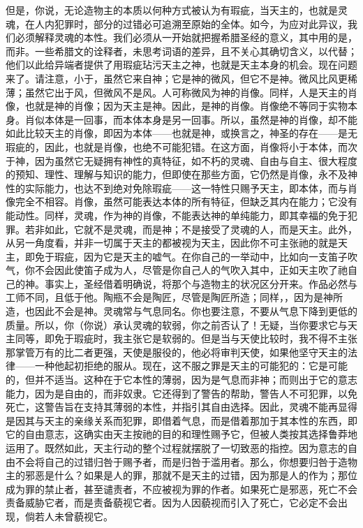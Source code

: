 但是，你说，无论造物主的本质以何种方式被认为有瑕疵，当天主的，也就是灵魂，在人内犯罪时，部分的过错必可追溯至原始的全体。如今，为应对此异议，我们必须解释灵魂的本性。我们必须从一开始就把握希腊圣经的意义，其中用的是，而非。一些希腊文的诠释者，未思考词语的差异，且不关心其确切含义，以代替；他们以此给异端者提供了用瑕疵玷污天主之神，也就是天主本身的机会。现在问题来了。请注意，小于，虽然它来自神；它是神的微风，但它不是神。微风比风更稀薄；虽然它出于风，但微风不是风。人可称微风为神的肖像。同样，人是天主的肖像，也就是神的肖像；因为天主是神。因此，是神的肖像。肖像绝不等同于实物本身。肖似本体是一回事，而本体本身是另一回事。所以，虽然是神的肖像，却不能如此比较天主的肖像，即因为本体——也就是神，或换言之，神圣的存在——是无瑕疵的，因此，也就是肖像，也绝不可能犯错。在这方面，肖像将小于本体，而次于神，因为虽然它无疑拥有神性的真特征，如不朽的灵魂、自由与自主、很大程度的预知、理性、理解与知识的能力，但即使在那些方面，它仍然是肖像，永不及神性的实际能力，也达不到绝对免除瑕疵——这一特性只赐予天主，即本体，而与肖像完全不相容。肖像，虽然可能表达本体的所有特征，但缺乏其内在能力；它没有能动性。同样，灵魂，作为神的肖像，不能表达神的单纯能力，即其幸福的免于犯罪。若非如此，它就不是灵魂，而是神；不是接受了灵魂的人，而是天主。此外，从另一角度看，并非一切属于天主的都被视为天主，因此你不可主张祂的就是天主，即免于瑕疵，因为它是天主的嘘气。在你自己的一举动中，比如向一支笛子吹气，你不会因此使笛子成为人，尽管是你自己人的气吹入其中，正如天主吹了祂自己的神。事实上，圣经借着明确说，将那个与造物主的状况区分开来。作品必然与工师不同，且低于他。陶瓶不会是陶匠，尽管是陶匠所造；同样，，因为是神所造，也因此不会是神。灵魂常与气息同名。你也要注意，不要从气息下降到更低的质量。所以，你（你说）承认灵魂的软弱，你之前否认了！无疑，当你要求它与天主同等，即免于瑕疵时，我主张它是软弱的。但是当与天使比较时，我不得不主张那掌管万有的比二者更强，天使是服役的，他必将审判天使，如果他坚守天主的法律——一种他起初拒绝的服从。现在，这不服之罪是天主的可能犯的：它是可能的，但并不适当。这种在于它本性的薄弱，因为是气息而非神；而则出于它的意志能力，因为是自由的，而非奴隶。它还得到了警告的帮助，警告人不可犯罪，以免死亡，这警告旨在支持其薄弱的本性，并指引其自由选择。因此，灵魂不能再显得是因其与天主的亲缘关系而犯罪，即借着气息，而是借着那加于其本性的东西，即它的自由意志，这确实由天主按祂的目的和理性赐予它，但被人类按其选择鲁莽地运用了。既然如此，天主行动的整个过程就摆脱了一切致恶的指控。因为意志的自由不会将自己的过错归咎于赐予者，而是归咎于滥用者。那么，你想要归咎于造物主的邪恶是什么？如果是人的罪，那就不是天主的过错，因为那是人的作为；那位成为罪的禁止者，甚至谴责者，不应被视为罪的作者。如果死亡是邪恶，死亡不会责备威胁它者，而是责备藐视它者。因为人因藐视而引入了死亡，它必定不会出现，倘若人未曾藐视它。\par

